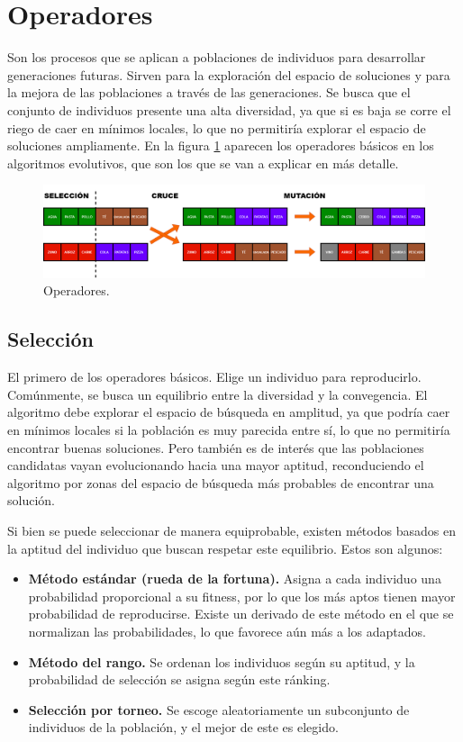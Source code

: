 \section{Operadores}

Son los procesos que se aplican a poblaciones de individuos para desarrollar generaciones futuras. Sirven para la exploración del espacio de soluciones y para la mejora de las poblaciones a través de las generaciones. Se busca que el conjunto de individuos presente una alta diversidad, ya que si es baja se corre el riego de caer en mínimos locales, lo que no permitiría explorar el espacio de soluciones ampliamente. En la figura \ref{fig:operadores} aparecen los operadores básicos en los algoritmos evolutivos, que son los que se van a explicar en más detalle.

\begin{figure}[H]
  \centering
  \includegraphics[width=1\textwidth]{figures/operadores.png}
  \caption{Operadores.}
  \label{fig:operadores}
\end{figure}

\subsection{Selección}
\label{Seleccion}

El primero de los operadores básicos. Elige un individuo para reproducirlo. Comúnmente, se busca un equilibrio entre la diversidad y la convegencia. El algoritmo debe explorar el espacio de búsqueda en amplitud, ya que podría caer en mínimos locales si la población es muy parecida entre sí, lo que no permitiría encontrar buenas soluciones. Pero también es de interés que las poblaciones candidatas vayan evolucionando hacia una mayor aptitud, reconduciendo el algoritmo por zonas del espacio de búsqueda más probables de encontrar una solución.

Si bien se puede seleccionar de manera equiprobable, existen métodos basados en la aptitud del individuo que buscan respetar este equilibrio. Estos son algunos:

\begin{itemize}
  \item \textbf{Método estándar (rueda de la fortuna).} Asigna a cada individuo una probabilidad proporcional a su fitness, por lo que los más aptos tienen mayor probabilidad de reproducirse. Existe un derivado de este método en el que se normalizan las probabilidades, lo que favorece aún más a los adaptados.
  \item \textbf{Método del rango.} Se ordenan los individuos según su aptitud, y la probabilidad de selección se asigna según este ránking.
  \item \textbf{Selección por torneo.} Se escoge aleatoriamente un subconjunto de individuos de la población, y el mejor de este es elegido.
\end{itemize}

